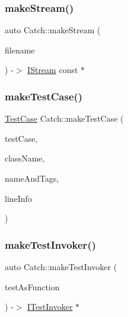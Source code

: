 \mbox{\label{namespace_catch_af6d27462573d60c30c51acf1c980e3ff}} 
\subsubsection{\texorpdfstring{makeStream()}{makeStream()}}
{\footnotesize\ttfamily auto Catch\+::make\+Stream (\begin{DoxyParamCaption}\item[{\mbox{\hyperlink{class_catch_1_1_string_ref}{String\+Ref}} const \&}]{filename }\end{DoxyParamCaption}) -\/$>$  \mbox{\hyperlink{struct_catch_1_1_i_stream}{I\+Stream}} const $\ast$}

\mbox{\label{namespace_catch_a5e63df38d06a43d4cee17454e724b5c0}} 
\subsubsection{\texorpdfstring{makeTestCase()}{makeTestCase()}}
{\footnotesize\ttfamily \mbox{\hyperlink{class_catch_1_1_test_case}{Test\+Case}} Catch\+::make\+Test\+Case (\begin{DoxyParamCaption}\item[{\mbox{\hyperlink{struct_catch_1_1_i_test_invoker}{I\+Test\+Invoker}} $\ast$}]{test\+Case,  }\item[{std\+::string const \&}]{class\+Name,  }\item[{\mbox{\hyperlink{struct_catch_1_1_name_and_tags}{Name\+And\+Tags}} const \&}]{name\+And\+Tags,  }\item[{\mbox{\hyperlink{struct_catch_1_1_source_line_info}{Source\+Line\+Info}} const \&}]{line\+Info }\end{DoxyParamCaption})}

\mbox{\label{namespace_catch_ab3d8ccbc900fe50322c39ecbba52f536}} 
\subsubsection{\texorpdfstring{makeTestInvoker()}{makeTestInvoker()}\hspace{0.1cm}{\footnotesize\ttfamily [1/2]}}
{\footnotesize\ttfamily auto Catch\+::make\+Test\+Invoker (\begin{DoxyParamCaption}\item[{void($\ast$)()}]{test\+As\+Function }\end{DoxyParamCaption}) -\/$>$  \mbox{\hyperlink{struct_catch_1_1_i_test_invoker}{I\+Test\+Invoker}} $\ast$\hspace{0.3cm}{\ttfamily [noexcept]}}

